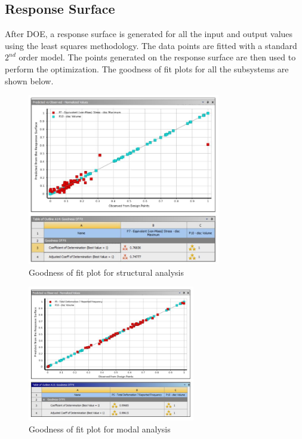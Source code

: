 \documentclass[12pt]{article}
\begin{document}
\subsection{Response Surface}
After DOE, a response surface is generated for all the input and output values using the least squares methodology. The data points are fitted with a standard $2^{nd}$ order model. The points generated on the response surface are then used to perform the optimization. The goodness of fit plots for all the subsystems are shown below.
\begin{figure}[H]
\begin{center}
\includegraphics[width=0.75\textwidth]{reg1.jpg}
\caption{Goodness of fit plot for structural analysis}
\end{center}
\end{figure}
\begin{figure}[H]
\begin{center}
\includegraphics[width=0.65\textwidth]{reg2.jpg}
\caption{Goodness of fit plot for modal analysis}
\end{center}
\end{figure}
\end{document}
